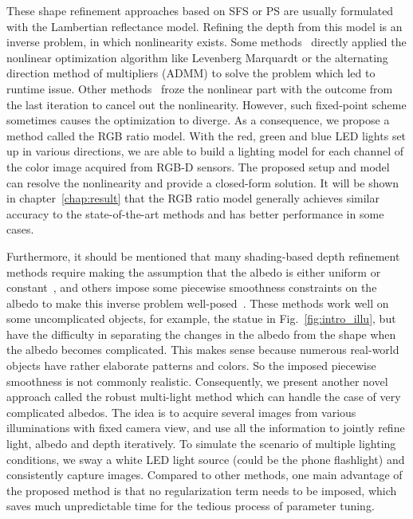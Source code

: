 These shape refinement approaches based on SFS or PS are usually formulated with the Lambertian reflectance model.
Refining the depth from this model is an inverse problem, in which nonlinearity exists. 
Some methods~\cite{wu2014real, or2016real} directly applied the nonlinear optimization algorithm like Levenberg Marquardt or the alternating direction method of multipliers (ADMM) to solve the problem which led to runtime issue. 
Other methods~\cite{or2015rgbd} froze the nonlinear part with the outcome from the last iteration to cancel out the nonlinearity.
However, such fixed-point scheme sometimes causes the optimization to diverge.
As a consequence, we propose a method called the RGB ratio model.
With the red, green and blue LED lights set up in various directions, we are able to build a lighting model for each channel of the color image acquired from RGB-D sensors.
The proposed setup and model can resolve the nonlinearity and provide a closed-form solution. 
It will be shown in chapter~\ref{chap:result} that the RGB ratio model generally achieves similar accuracy to the state-of-the-art methods and has better performance in some cases.


Furthermore, it should be mentioned that many shading-based depth refinement methods require making the assumption that the albedo is either uniform or constant~\cite{wu2011shading, han2013high, park2013multiview, haque2014high, queau2017dense}, and others impose some piecewise smoothness constraints on the albedo to make this inverse problem well-posed~\cite{or2015rgbd, or2016real, kim2015joint, wu2014real}.
These methods work well on some uncomplicated objects, for example, the statue in Fig.~\ref{fig:intro_illu}, but have the difficulty in separating the changes in the albedo from the shape when the albedo becomes complicated. This makes sense because numerous real-world objects have rather elaborate patterns and colors.
So the imposed piecewise smoothness is not commonly realistic.
Consequently, we present another novel approach called the robust multi-light method which can handle the case of very complicated albedos.
The idea is to acquire several images from various illuminations with fixed camera view, and use all the information to jointly refine light, albedo and depth iteratively.
To simulate the scenario of multiple lighting conditions, we sway a white LED light source (could be the phone flashlight) and consistently capture images. 
Compared to other methods, one main advantage of the proposed method is that no regularization term needs to be imposed, which saves much unpredictable time for the tedious process of parameter tuning.

